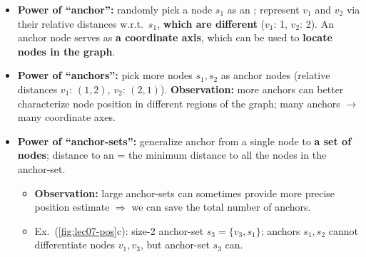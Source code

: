 \begin{itemize}
  \item \textbf{Power of ``anchor'':} randomly pick a node $s_1$ as an ; represent $v_1$ and $v_2$ via their relative distances w.r.t.\ $s_1$,
    \textbf{which are different} ($v_1$: 1, $v_2$: 2). An anchor node serves as
    \textbf{a coordinate axis}, which can be used to \textbf{locate nodes in the
    graph}.
  \item \textbf{Power of ``anchors'':} pick more nodes $s_1,s_2$ as anchor nodes
    (relative distances $v_1$: $(1,2)$, $v_2$: $(2,1)$). \textbf{Observation:} more
    anchors can better characterize node position in different regions of the
    graph; many anchors $\to$ many coordinate axes.
  \item \textbf{Power of ``anchor-sets'':} generalize anchor from a single node to
    \textbf{a set of nodes}; distance to an  = the minimum distance
    to all the nodes in the anchor-set.
    \begin{itemize}
      \item \textbf{Observation:} large anchor-sets can sometimes provide more
        precise position estimate $\Rightarrow$ we can save the total number of
        anchors.
      \item Ex.\ (\cref{fig:lec07-pos}c): size-2 anchor-set $s_3=\{v_3, s_1\}$;
        anchors $s_1,s_2$ cannot differentiate nodes $v_1,v_3$, but anchor-set
        $s_3$ can.
    \end{itemize}
\end{itemize}

